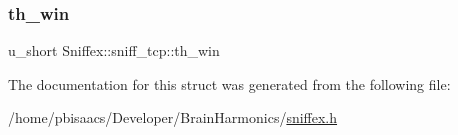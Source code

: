 \subsubsection{\texorpdfstring{th\+\_\+win}{th\_win}}
{\footnotesize\ttfamily u\+\_\+short Sniffex\+::sniff\+\_\+tcp\+::th\+\_\+win}



The documentation for this struct was generated from the following file\+:\begin{DoxyCompactItemize}
\item 
/home/pbisaacs/\+Developer/\+Brain\+Harmonics/\mbox{\hyperlink{sniffex_8h}{sniffex.\+h}}\end{DoxyCompactItemize}
